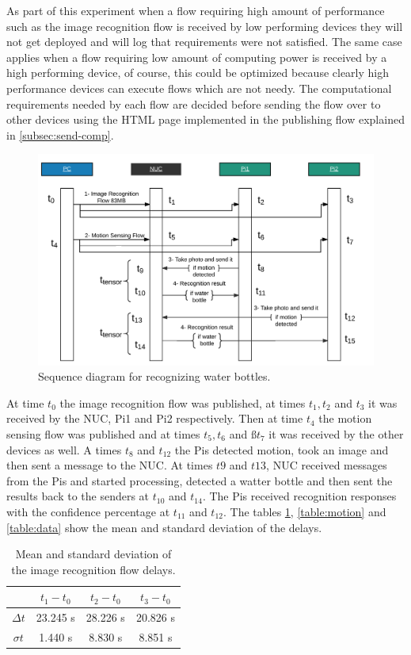 \noindent As part of this experiment when a flow requiring high amount of performance such as the image recognition flow is received by low performing devices they will not get deployed and  will log that requirements were not satisfied. The same case applies when a flow requiring low amount of computing power is received by a high performing device, of course, this could be optimized because clearly high performance devices can execute flows which are not needy. The computational requirements needed by each flow are decided before sending the flow over to other devices using the HTML page implemented in the publishing flow explained in \ref{subsec:send-comp}.

\begin{figure}[H]
	\centering
	\includegraphics[scale=0.45]{images/sequence-diagram.png}
	\caption{Sequence diagram for recognizing water bottles.}
	\label{fig:sd-tensor}
\end{figure} 
 


\noindent At time $t_0$ the image recognition flow was published, at times $t_1, t_2$ and   $t_3$ it was received by the NUC, Pi1 and Pi2 respectively. Then at time $t_4$ the motion sensing flow was published and at times $t_5,t_6$ and $ßt_7$ it was received by the other devices as well. A times $t_8$ and $t_{12}$  the Pis detected motion, took an image and then sent a message to the NUC. At times $t9$ and $t{13}$,  NUC received messages from the Pis and started processing, detected a watter bottle and then sent the  results back to the senders at $t_{10}$ and $t_{14}$. The Pis received recognition responses with the confidence percentage at $t_{11}$ and $t_{12}$.  The tables \ref{table:tensor}, \ref{table:motion} and \ref{table:data} show the mean and standard deviation of the delays.  
\begin{table}[H]
\centering
\begin{tabular}{*{4}{c}}\toprule
&$t_1 - t_0$  & $t_2 - t_0$  & $t_3-t_0$ \\ \midrule
$\Delta t$&	23.245 s&28.226 s&20.826 s\\ 
$\sigma	t$ &1.440 s&8.830 s&8.851 s\\
\end{tabular}
\caption{Mean and standard deviation of the image recognition flow delays.}
\label{table:tensor}
\end{table}


